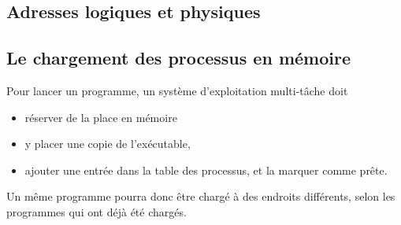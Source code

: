 \begin{multicols}{2}




\section{Adresses logiques et physiques}
\subsection{Le chargement des processus en mémoire}

Pour lancer un programme, un système d'exploitation multi-tâche
doit 
\begin{itemize}
\item réserver de la place en mémoire
\item y placer une copie de l'exécutable,
\item ajouter une entrée dans la table des processus, 
et la marquer comme prête.
\end{itemize}


Un même programme pourra donc être chargé à des endroits différents,
selon les programmes qui ont déjà été chargés.


\end{multicols}
